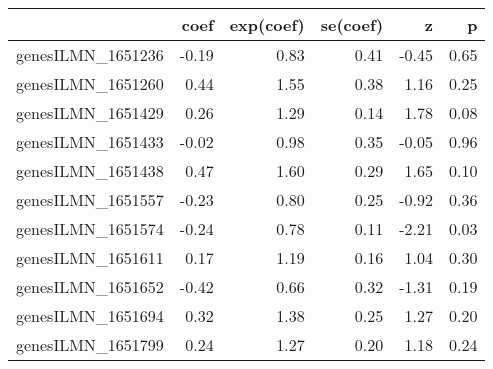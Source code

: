 \begin{table}[ht]
\centering
\begin{tabular}{rrrrrr}
  \hline
 & coef & exp(coef) & se(coef) & z & p \\ 
  \hline
genesILMN\_1651236 & -0.19 & 0.83 & 0.41 & -0.45 & 0.65 \\ 
  genesILMN\_1651260 & 0.44 & 1.55 & 0.38 & 1.16 & 0.25 \\ 
  genesILMN\_1651429 & 0.26 & 1.29 & 0.14 & 1.78 & 0.08 \\ 
  genesILMN\_1651433 & -0.02 & 0.98 & 0.35 & -0.05 & 0.96 \\ 
  genesILMN\_1651438 & 0.47 & 1.60 & 0.29 & 1.65 & 0.10 \\ 
  genesILMN\_1651557 & -0.23 & 0.80 & 0.25 & -0.92 & 0.36 \\ 
  genesILMN\_1651574 & -0.24 & 0.78 & 0.11 & -2.21 & 0.03 \\ 
  genesILMN\_1651611 & 0.17 & 1.19 & 0.16 & 1.04 & 0.30 \\ 
  genesILMN\_1651652 & -0.42 & 0.66 & 0.32 & -1.31 & 0.19 \\ 
  genesILMN\_1651694 & 0.32 & 1.38 & 0.25 & 1.27 & 0.20 \\ 
  genesILMN\_1651799 & 0.24 & 1.27 & 0.20 & 1.18 & 0.24 \\ 
   \hline
\end{tabular}
\end{table}
